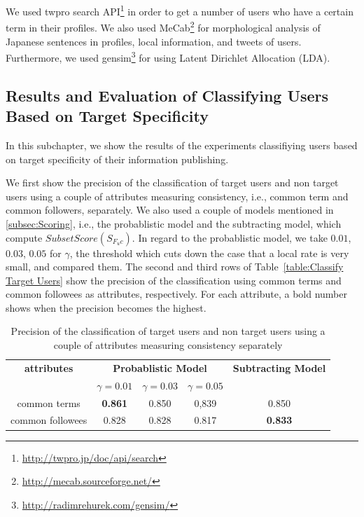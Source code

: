 We used twpro search API\footnote{\url{http://twpro.jp/doc/api/search}}
in order to get a number of users who have a certain term in their
profiles.  We also used
MeCab\footnote{\url{http://mecab.sourceforge.net/}} for morphological
analysis of Japanese sentences in profiles, local information, and
tweets of users.  Furthermore, we used
gensim\footnote{\url{http://radimrehurek.com/gensim/}} for using Latent
Dirichlet Allocation (LDA).

\subsection{Results and Evaluation of Classifying Users Based on Target
  Specificity}
\label{subsec:Results of Method1}

In this subchapter, we show the results of the experiments classifiying
users based on target specificity of their information publishing.

We first show the precision of the classification of target users and
non target users using a couple of attributes measuring consistency,
i.e., common term and common followers, separately.  We also used a
couple of models mentioned in \ref{subsec:Scoring}, i.e., the
probablistic model and the subtracting model, which compute
$\mathit{SubsetScore}(S_{F_uc})$.  In regard to the probablistic model,
we take $0.01$, $0.03$, $0.05$ for $\gamma$, the threshold which cuts
down the case that a local rate is very small, and
compared them.  The second and third rows of Table~\ref{table:Classify
Target Users} show the precision of the classification using common
terms and common followees as attributes, respectively.  For each
attribute, a bold number shows when the precision becomes the highest.

\begin{table}[t]
\caption{Precision of the classification of target users and non target
 users using a couple of attributes measuring consistency separately
 \label{table:Classify Target Users}}
\begin{center}
\begin{tabular}{ccccc}
 \toprule
 {\bf attributes} & \multicolumn{3}{c}{{\bf Probablistic Model}} & {\bf
 Subtracting Model} \\
 & $\gamma = 0.01$ & $\gamma = 0.03$ & $\gamma = 0.05$ & \\
 \cmidrule(lr){1-1}\cmidrule(lr){2-4}\cmidrule(lr){5-5}
 common terms & {\bf 0.861} & 0.850 & 0,839 & 0.850 \\
 common followees & 0.828 & 0.828 & 0.817 & {\bf 0.833} \\
 \bottomrule
\end{tabular}
\end{center}
\end{table}


